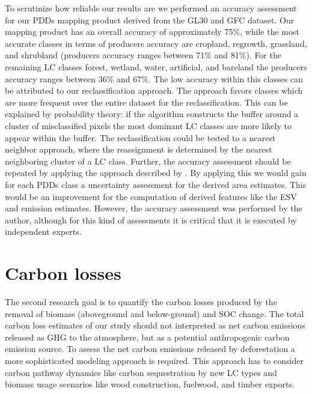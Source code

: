		To scrutinize how reliable our results are we performed an accuracy assessment for our \acp{PDD} mapping product derived from the \ac{GL30} and \ac{GFC} dataset. Our mapping product has an overall accuracy of approximately 75\%, while the most accurate classes in terms of producers accuracy are cropland, regrowth, grassland, and shrubland (producers accuracy ranges between 71\% and 81\%). For the remaining \ac{LC} classes forest, wetland, water, artificial, and bareland the producers accuracy ranges between 36\% and 67\%. The low accuracy within this classes can be attributed to our reclassification approach. The approach favors classes which are more frequent over the entire dataset for the reclassification. This can be explained by probability theory: if the algorithm constructs the buffer around a cluster of misclassified pixels the most dominant \ac{LC} classes are more likely to appear within the buffer. The reclassification could be tested to a nearest neighbor approach, where the reassignment is determined by the nearest neighboring cluster of a \ac{LC} class. Further, the accuracy assessment should be repeated by applying the approach described by \citet{Olofsson2014}. By applying this we would gain for each \acp{PDD} class a uncertainty assessment for the derived area estimates. This would be an improvement for the computation of derived features like the \ac{ESV} and emission estimates. However, the accuracy assessment was performed by the author, although for this kind of assessments it is critical that it is executed by independent experts.

	\section{Carbon losses}
		The second research goal is to quantify the carbon losses produced by the removal of biomass (aboveground and below-ground) and \ac{SOC} change. The total carbon loss estimates of our study should not interpreted as net carbon emissions released as \ac{GHG} to the atmosphere, but as a potential anthropogenic carbon emission source. To assess the net carbon emissions released by deforestation a more sophisticated modeling approach is required. This approach has to consider carbon pathway dynamics like carbon sequestration by new \ac{LC} types and biomass usage scenarios like wood construction, fuelwood, and timber exports.

